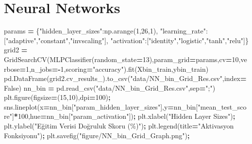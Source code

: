 \documentclass[12pt,twoside]{deuthesis}
\newenvironment{Shaded}{\begin{snugshade}}{\end{snugshade}}
\newcommand{\DecValTok}[1]{\textcolor[rgb]{0.00,0.00,0.81}{#1}}
\newcommand{\NormalTok}[1]{#1}
\newcommand{\OperatorTok}[1]{\textcolor[rgb]{0.81,0.36,0.00}{\textbf{#1}}}
\newcommand{\StringTok}[1]{\textcolor[rgb]{0.31,0.60,0.02}{#1}}
\newcommand{\VariableTok}[1]{\textcolor[rgb]{0.00,0.00,0.00}{#1}}
\begin{document}
\hypertarget{neural-networks}{%
\section{Neural Networks}\label{neural-networks}}
\begin{Shaded}
\begin{Highlighting}[]
\NormalTok{params }\OperatorTok{=}\NormalTok{ \{}\StringTok{"hidden\_layer\_sizes"}\NormalTok{:np.arange(}\DecValTok{1}\NormalTok{,}\DecValTok{26}\NormalTok{,}\DecValTok{1}\NormalTok{),}
          \StringTok{"learning\_rate"}\NormalTok{:[}\StringTok{"adaptive"}\NormalTok{,}\StringTok{"constant"}\NormalTok{,}\StringTok{"invscaling"}\NormalTok{],}
          \StringTok{"activation"}\NormalTok{:[}\StringTok{"identity"}\NormalTok{,}\StringTok{"logistic"}\NormalTok{,}\StringTok{"tanh"}\NormalTok{,}\StringTok{"relu"}\NormalTok{]\}}
\NormalTok{grid2 }\OperatorTok{=}\NormalTok{ GridSearchCV(MLPClassifier(random\_state}\OperatorTok{=}\DecValTok{13}\NormalTok{),param\_grid}\OperatorTok{=}\NormalTok{params,cv}\OperatorTok{=}\DecValTok{10}\NormalTok{,verbose}\OperatorTok{=}\DecValTok{1}\NormalTok{,n\_jobs}\OperatorTok{={-}}\DecValTok{1}\NormalTok{,scoring}\OperatorTok{=}\StringTok{"accuracy"}\NormalTok{).fit(Xbin\_train,ybin\_train)}
\NormalTok{pd.DataFrame(grid2.cv\_results\_).to\_csv(}\StringTok{"data/NN\_bin\_Grid\_Res.csv"}\NormalTok{,index}\OperatorTok{=}\VariableTok{False}\NormalTok{)}
\NormalTok{nn\_bin }\OperatorTok{=}\NormalTok{ pd.read\_csv(}\StringTok{"data/NN\_bin\_Grid\_Res.csv"}\NormalTok{,sep}\OperatorTok{=}\StringTok{";"}\NormalTok{)}
\NormalTok{plt.figure(figsize}\OperatorTok{=}\NormalTok{(}\DecValTok{15}\NormalTok{,}\DecValTok{10}\NormalTok{),dpi}\OperatorTok{=}\DecValTok{100}\NormalTok{)}\OperatorTok{;}
\NormalTok{sns.lineplot(x}\OperatorTok{=}\NormalTok{nn\_bin[}\StringTok{"param\_hidden\_layer\_sizes"}\NormalTok{],y}\OperatorTok{=}\NormalTok{nn\_bin[}\StringTok{"mean\_test\_score"}\NormalTok{]}\OperatorTok{*}\DecValTok{100}\NormalTok{,hue}\OperatorTok{=}\NormalTok{nn\_bin[}\StringTok{"param\_activation"}\NormalTok{])}\OperatorTok{;}
\NormalTok{plt.xlabel(}\StringTok{"Hidden Layer Sizes"}\NormalTok{)}\OperatorTok{;}
\NormalTok{plt.ylabel(}\StringTok{"Eğitim Verisi Doğruluk Skoru (\%)"}\NormalTok{)}\OperatorTok{;}
\NormalTok{plt.legend(title}\OperatorTok{=}\StringTok{"Aktivasyon Fonksiyonu"}\NormalTok{)}\OperatorTok{;}
\NormalTok{plt.savefig(}\StringTok{"figure/NN\_bin\_Grid\_Graph.png"}\NormalTok{)}\OperatorTok{;}
\end{Highlighting}
\end{Shaded}
\end{document}
